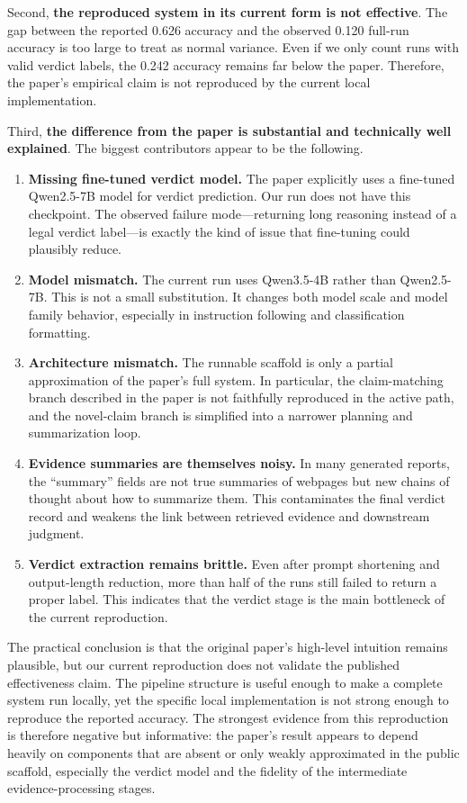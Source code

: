 \documentclass[11pt]{article}
\begin{document}
Second, \textbf{the reproduced system in its current form is not effective}. The gap between the reported 0.626 accuracy and the observed 0.120 full-run accuracy is too large to treat as normal variance. Even if we only count runs with valid verdict labels, the 0.242 accuracy remains far below the paper. Therefore, the paper's empirical claim is not reproduced by the current local implementation.

Third, \textbf{the difference from the paper is substantial and technically well explained}. The biggest contributors appear to be the following.

\begin{enumerate}[leftmargin=*]
\item \textbf{Missing fine-tuned verdict model.} The paper explicitly uses a fine-tuned Qwen2.5-7B model for verdict prediction. Our run does not have this checkpoint. The observed failure mode---returning long reasoning instead of a legal verdict label---is exactly the kind of issue that fine-tuning could plausibly reduce.
\item \textbf{Model mismatch.} The current run uses Qwen3.5-4B rather than Qwen2.5-7B. This is not a small substitution. It changes both model scale and model family behavior, especially in instruction following and classification formatting.
\item \textbf{Architecture mismatch.} The runnable scaffold is only a partial approximation of the paper's full system. In particular, the claim-matching branch described in the paper is not faithfully reproduced in the active path, and the novel-claim branch is simplified into a narrower planning and summarization loop.
\item \textbf{Evidence summaries are themselves noisy.} In many generated reports, the ``summary'' fields are not true summaries of webpages but new chains of thought about how to summarize them. This contaminates the final verdict record and weakens the link between retrieved evidence and downstream judgment.
\item \textbf{Verdict extraction remains brittle.} Even after prompt shortening and output-length reduction, more than half of the runs still failed to return a proper label. This indicates that the verdict stage is the main bottleneck of the current reproduction.
\end{enumerate}

The practical conclusion is that the original paper's high-level intuition remains plausible, but our current reproduction does not validate the published effectiveness claim. The pipeline structure is useful enough to make a complete system run locally, yet the specific local implementation is not strong enough to reproduce the reported accuracy. The strongest evidence from this reproduction is therefore negative but informative: the paper's result appears to depend heavily on components that are absent or only weakly approximated in the public scaffold, especially the verdict model and the fidelity of the intermediate evidence-processing stages.
\end{document}
